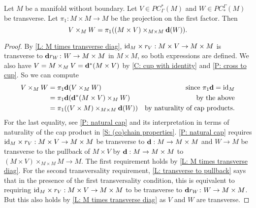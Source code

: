 \begin{lemma}\label{L: diagonal version of intersection}
Let $M$ be a manifold without boundary. Let $V\in PC^*_\Gamma(M)$ and $W\in PC_*^\Gamma(M)$ be transverse. Let $\pi_1:M\times M\to M$ be the projection on the first factor. Then $$V\times_M W=\pi_1((M\times V)\times_{M\times M} \mathbf{d}(W)).$$
\end{lemma}
\begin{proof}
By \cref{L: M times transverse diag}, $\mathrm{id}_M\times r_V:M\times V\to M\times M$ is transverse to $\mathbf{d} r_W \colon W \to M\times M$ in $M\times M$, so both expressions are defined. We also have $V=M\times_M V=\mathbf{d}^*(M\times V)$ by \cref{C: cup with identity} and \cref{P: cross to cup}.
So we can compute
\begin{align*}
V\times_M W&=\pi_1\mathbf{d} (V\times_M W)&\text{since $\pi_1\mathbf{d}=\mathrm{id}_M$}\\
&=\pi_1\mathbf{d} (\mathbf{d}^*(M\times V)\times_M W)&\text{by the above}\\
&=\pi_1((V\times M)\times_{M\times M}\mathbf{d}(W))&\text{by naturality of cap products.}
\end{align*}
For the last equality, see \cref{P: natural cap} and its interpretation in terms of naturality of the cap product in \cref{S: (co)chain properties}. \cref{P: natural cap} requires $\mathrm{id}_M\times r_V:M\times V\to M\times M$ be transverse to $\mathbf{d}:M\to M\times M$ and $W\to M$ be transverse to the pullback of $M\times V$ by $\mathbf{d}:M\to M\times M$ to
$(M\times V)\times_{M\times M}M\to M$.
The first requirement holds by \cref{L: M times transverse diag}. For the second transversality requirement, \cref{L: transverse to pullback} says that in the presence of the first transversality condition, this is equivalent to requiring $\mathrm{id}_M\times r_V:M\times V\to M\times M$ to be transverse to $\mathbf{d} r_W \colon W \to M\times M$. But this also holds by \cref{L: M times transverse diag} as $V$ and $W$ are transverse.
\end{proof}


